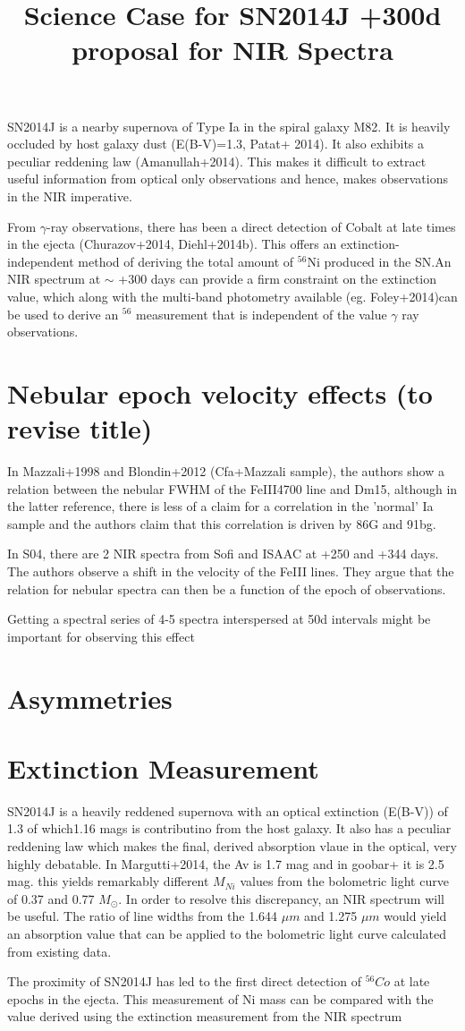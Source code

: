 \documentclass{article}
\begin{document}
\title{Science Case for SN2014J +300d proposal for NIR Spectra}
\maketitle

SN2014J is a nearby supernova of Type Ia in the spiral galaxy M82. It is heavily occluded by host galaxy dust (E(B-V)=1.3,  Patat+ 2014). It also exhibits a peculiar reddening law (Amanullah+2014). This makes it difficult to extract useful information from optical only observations and hence, makes observations in the NIR imperative. 

From $\gamma$-ray observations, there has been a direct detection of Cobalt at late times in the ejecta (Churazov+2014, Diehl+2014b). This offers an extinction-independent method of deriving the total amount of $^{56}$Ni produced in the SN.An NIR spectrum at $\sim$ +300 days can provide a firm constraint on the extinction value, which along with the multi-band photometry available (eg. Foley+2014)can be used to derive an $^{56}$ measurement that is independent of the value $\gamma$ ray observations.   


\section{Nebular epoch velocity effects (to revise title)}
In Mazzali+1998 and Blondin+2012 (Cfa+Mazzali sample), the authors show a relation between the nebular FWHM of the FeIII4700 line and Dm15, although in the latter reference, there is less of  a claim for a correlation in the 'normal' Ia sample and the authors claim that this correlation is driven by 86G and 91bg.

In S04, there are 2 NIR spectra from Sofi and ISAAC at +250 and +344 days. The authors observe a shift in the velocity of the FeIII lines. They argue that the relation for nebular spectra can then be a function of the epoch of observations.

Getting a spectral series of 4-5 spectra interspersed at 50d intervals might be important for observing this effect

\section{Asymmetries}


\section{Extinction Measurement}
SN2014J is a heavily reddened supernova with an optical extinction (E(B-V)) of 1.3 of which1.16 mags is contributino from the host galaxy. It also has a peculiar reddening law which makes the final, derived absorption vlaue in the optical, very highly debatable. In Margutti+2014, the Av is 1.7 mag and in goobar+ it is 2.5 mag. this yields remarkably different $M_{Ni}$ values from the bolometric light curve of 0.37 and 0.77 $M_{\odot}$. In order to resolve this discrepancy, an NIR spectrum will be useful. The ratio of line widths from the 1.644 $\mu m$ and 1.275 $\mu m$ would yield an absorption value that can be applied to the bolometric light curve calculated from existing data. 

The proximity of SN2014J has led to the first direct detection of $^{56}Co$ at late epochs in the ejecta. This measurement of Ni mass can be compared with the value derived using the extinction measurement from the NIR spectrum

 
\end{document}
